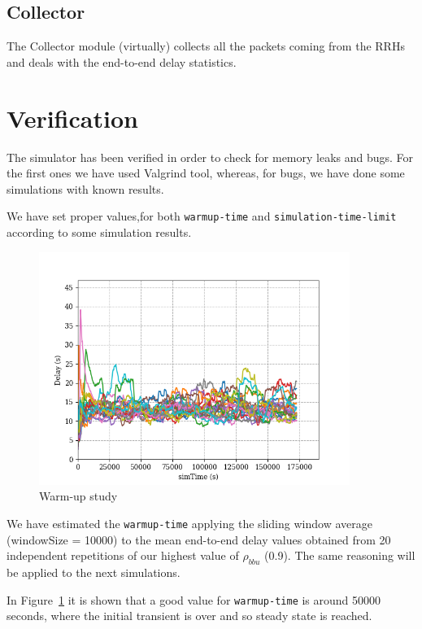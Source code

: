 \documentclass[11pt,a4paper,oneside, openright]{article}
\begin{document}
\subsection{Collector}
The Collector module (virtually) collects all the packets coming from the RRHs and deals with the end-to-end delay statistics.



\section{Verification}
The simulator has been verified in order to check for memory leaks and bugs.
For the first ones we have used Valgrind tool, whereas, for bugs, we have done some simulations with known results.

We have set proper values,for both \texttt{warmup-time} and \texttt{simulation-time-limit} according to some simulation results.
\begin{figure}[h]
	\centering
	\includegraphics[width=0.9\textwidth]{images/warm-up}
	\caption{Warm-up study}
	\label{fig:warm-up-study}
\end{figure}

We have estimated the \texttt{warmup-time} applying the sliding window average (windowSize = 10000) to the mean end-to-end delay values obtained from 20 independent repetitions of our highest value of $ \rho_{bbu} $ (0.9). The same reasoning will be applied to the next simulations.

In Figure~\ref{fig:warm-up-study} it is shown that a good value for \texttt{warmup-time} is around 50000 seconds, where the initial transient is over and so steady state is reached. 
\end{document}

